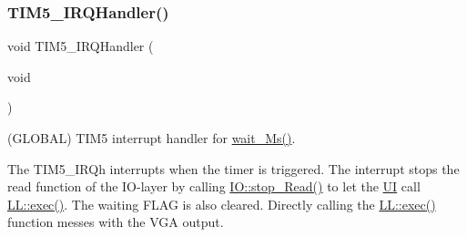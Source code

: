 \mbox{\label{namespace_l_l_a5e66446caf21dd90191dc07a13ce2378}} 
\subsubsection{\texorpdfstring{T\+I\+M5\+\_\+\+I\+R\+Q\+Handler()}{TIM5\_IRQHandler()}}
{\footnotesize\ttfamily void T\+I\+M5\+\_\+\+I\+R\+Q\+Handler (\begin{DoxyParamCaption}\item[{void}]{ }\end{DoxyParamCaption})}



(G\+L\+O\+B\+AL) T\+I\+M5 interrupt handler for \mbox{\hyperlink{namespace_l_l_ab30bdedb41438098df71bea7d5eb624d}{wait\+\_\+\+Ms()}}. 

The T\+I\+M5\+\_\+\+I\+R\+Qh interrupts when the timer is triggered. The interrupt stops the read function of the I\+O-\/layer by calling \mbox{\hyperlink{namespace_i_o_a04c5db8c053f07761c5c09894a4bd49d}{I\+O\+::stop\+\_\+\+Read()}} to let the \mbox{\hyperlink{namespace_u_i}{UI}} call \mbox{\hyperlink{namespace_l_l_ac98bc19f4e3468b76cfc2e43456527cc}{L\+L\+::exec()}}. The waiting F\+L\+AG is also cleared. Directly calling the \mbox{\hyperlink{namespace_l_l_ac98bc19f4e3468b76cfc2e43456527cc}{L\+L\+::exec()}} function messes with the V\+GA output.


